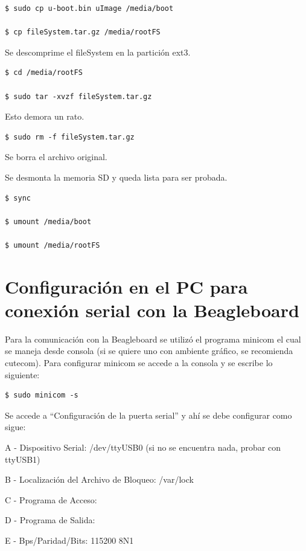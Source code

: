 \begin{verbatim}
$ sudo cp u-boot.bin uImage /media/boot

$ cp fileSystem.tar.gz /media/rootFS
\end{verbatim}

Se descomprime el fileSystem en la partición ext3.

\begin{verbatim}
$ cd /media/rootFS

$ sudo tar -xvzf fileSystem.tar.gz
\end{verbatim}

Esto demora un rato.

\begin{verbatim}
$ sudo rm -f fileSystem.tar.gz
\end{verbatim}

Se borra el archivo original.

\bigskip
Se desmonta la memoria SD y queda lista para ser probada. 

\begin{verbatim}
$ sync

$ umount /media/boot

$ umount /media/rootFS
\end{verbatim}

\newpage
\section{Configuración en el PC para conexión serial con la Beagleboard}\label{serialBb}

\bigskip
Para la comunicación con la Beagleboard se utilizó el programa minicom el cual se maneja 
desde consola (si se quiere uno con ambiente gráfico, se recomienda cutecom). 
Para configurar minicom se accede a la consola y se escribe lo siguiente: 

\begin{verbatim}
$ sudo minicom -s
\end{verbatim}

Se accede a “Configuración de la puerta serial” y ahí se debe configurar como sigue: 

A - Dispositivo Serial: /dev/ttyUSB0 (si no se encuentra nada, probar con ttyUSB1) 

B - Localización del Archivo de Bloqueo: /var/lock 

C - Programa de Acceso: 

D - Programa de Salida: 

E - Bps/Paridad/Bits: 115200 8N1 


